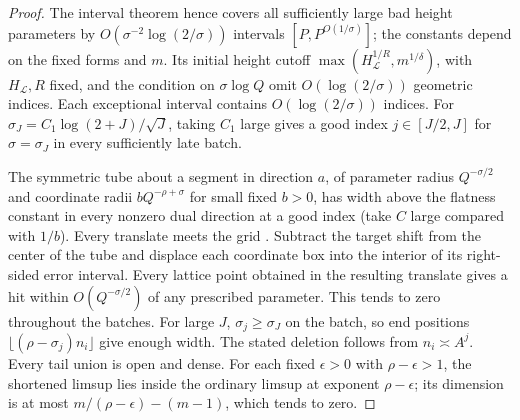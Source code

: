 \documentclass[11pt,reqno,a4paper]{amsart}
\theoremstyle{remark}
\numberwithin{equation}{section}
\begin{document}
\begin{proof}
The interval theorem hence covers all sufficiently large bad height parameters by \(O(\sigma^{-2}\log(2/\sigma))\) intervals \([P,P^{O(1/\sigma)}]\); the constants depend on the fixed forms and \(m\). Its initial height cutoff \(\max(H_{\mathcal L}^{1/R},m^{1/\delta})\), with \(H_{\mathcal L},R\) fixed, and the condition on \(\sigma\log Q\) omit \(O(\log(2/\sigma))\) geometric indices. Each exceptional interval contains \(O(\log(2/\sigma))\) indices. For \(\sigma_J=C_1\log(2+J)/\sqrt J\), taking \(C_1\) large gives a good index \(j\in[J/2,J]\) for \(\sigma=\sigma_J\) in every sufficiently late batch.

The symmetric tube about a segment in direction \(a\), of parameter radius \(Q^{-\sigma/2}\) and coordinate radii \(bQ^{-\rho+\sigma}\) for small fixed \(b>0\), has width above the flatness constant in every nonzero dual direction at a good index (take \(C\) large compared with \(1/b\)). Every translate meets the grid \cite{KL}. Subtract the target shift from the center of the tube and displace each coordinate box into the interior of its right-sided error interval. Every lattice point obtained in the resulting translate gives a hit within \(O(Q^{-\sigma/2})\) of any prescribed parameter. This tends to zero throughout the batches. For large \(J\), \(\sigma_j\ge\sigma_J\) on the batch, so end positions \(\lfloor(\rho-\sigma_j)n_i\rfloor\) give enough width. The stated deletion follows from \(n_i\asymp A^j\). Every tail union is open and dense. For each fixed \(\epsilon>0\) with \(\rho-\epsilon>1\), the shortened limsup lies inside the ordinary limsup at exponent \(\rho-\epsilon\); its dimension is at most \(m/(\rho-\epsilon)-(m-1)\), which tends to zero.
\end{proof}
\end{document}
